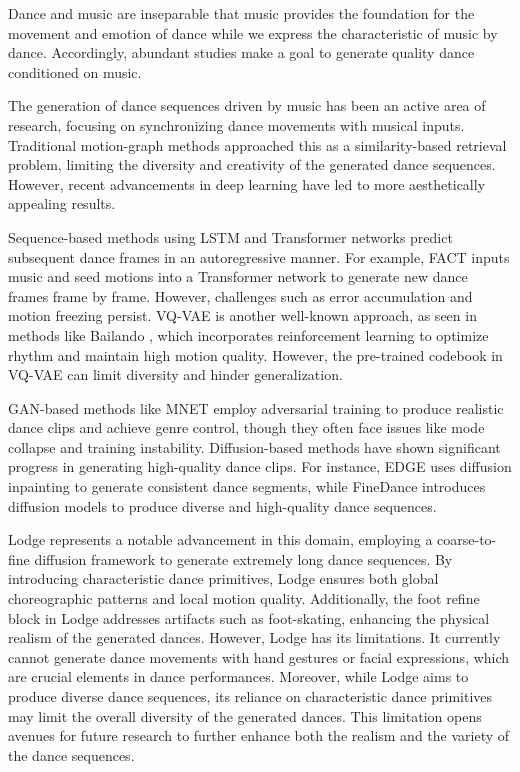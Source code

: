 Dance and music are inseparable that music provides the foundation for the movement and emotion of dance while we express the characteristic of music by dance. Accordingly, abundant studies make a goal to generate quality dance conditioned on music.

The generation of dance sequences driven by music has been an active area of research, focusing on synchronizing dance movements with musical inputs. Traditional motion-graph methods approached this as a similarity-based retrieval problem, limiting the diversity and creativity of the generated dance sequences. However, recent advancements in deep learning have led to more aesthetically appealing results.

Sequence-based methods using LSTM and Transformer networks predict subsequent dance frames in an autoregressive manner. For example, FACT \cite{li2021ai} inputs music and seed motions into a Transformer network to generate new dance frames frame by frame. However, challenges such as error accumulation and motion freezing persist. VQ-VAE is another well-known approach, as seen in methods like Bailando \cite{siyao2022bailando}, which incorporates reinforcement learning to optimize rhythm and maintain high motion quality. However, the pre-trained codebook in VQ-VAE can limit diversity and hinder generalization.

GAN-based methods like MNET \cite{kim2022brand} employ adversarial training to produce realistic dance clips and achieve genre control, though they often face issues like mode collapse and training instability. Diffusion-based methods have shown significant progress in generating high-quality dance clips. For instance, EDGE \cite{tseng2023edge} uses diffusion inpainting to generate consistent dance segments, while FineDance \cite{li2023finedance} introduces diffusion models to produce diverse and high-quality dance sequences.

Lodge \cite{li2024lodge} represents a notable advancement in this domain, employing a coarse-to-fine diffusion framework to generate extremely long dance sequences. By introducing characteristic dance primitives, Lodge ensures both global choreographic patterns and local motion quality. Additionally, the foot refine block in Lodge addresses artifacts such as foot-skating, enhancing the physical realism of the generated dances. However, Lodge has its limitations. It currently cannot generate dance movements with hand gestures or facial expressions, which are crucial elements in dance performances. Moreover, while Lodge aims to produce diverse dance sequences, its reliance on characteristic dance primitives may limit the overall diversity of the generated dances. This limitation opens avenues for future research to further enhance both the realism and the variety of the dance sequences.